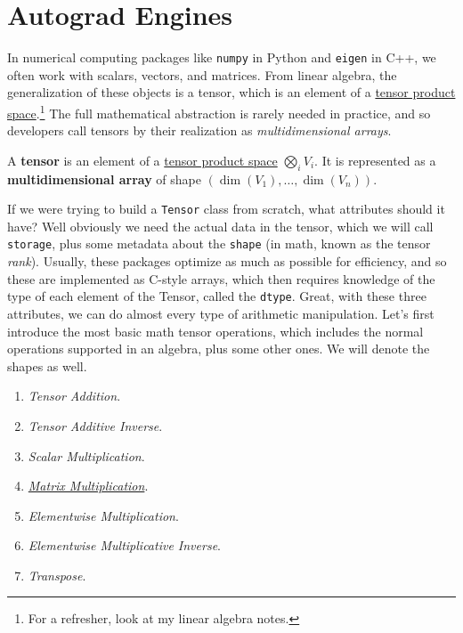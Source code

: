 \section{Autograd Engines}

  In numerical computing packages like \texttt{numpy} in Python and \texttt{eigen} in C++, we often work with scalars, vectors, and matrices. From linear algebra, the generalization of these objects is a tensor, which is an element of a \hyperref[lin-def:tensor]{tensor product space}.\footnote{For a refresher, look at my linear algebra notes.} The full mathematical abstraction is rarely needed in practice, and so developers call tensors by their realization as \textit{multidimensional arrays}. 
  
  \begin{definition}[Tensor]
    \label{def:tensor}
    A \textbf{tensor} is an element of a \hyperref[lin-def:tensor]{tensor product space} $\bigotimes_i V_i$. It is represented as a \textbf{multidimensional array} of shape $(\dim(V_1), \ldots, \dim(V_n))$. 
  \end{definition}

  If we were trying to build a \texttt{Tensor} class from scratch, what attributes should it have? Well obviously we need the actual data in the tensor, which we will call \texttt{storage}, plus some metadata about the \texttt{shape} (in math, known as the tensor \textit{rank}). Usually, these packages optimize as much as possible for efficiency, and so these are implemented as C-style arrays, which then requires knowledge of the type of each element of the Tensor, called the \texttt{dtype}. Great, with these three attributes, we can do almost every type of arithmetic manipulation. Let's first introduce the most basic math tensor operations, which includes the normal operations supported in an algebra, plus some other ones. We will denote the shapes as well. 
  \begin{enumerate}
    \item \textit{Tensor Addition}. 
    \item \textit{Tensor Additive Inverse}. 
    \item \textit{Scalar Multiplication}. 
    \item \textit{\hyperref[lin-def:matrix-multiplication]{Matrix Multiplication}}. 
    \item \textit{Elementwise Multiplication}. 
    \item \textit{Elementwise Multiplicative Inverse}.  
    \item \textit{Transpose}. 
  \end{enumerate} 

